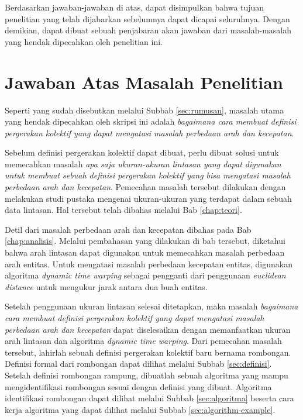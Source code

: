 Berdasarkan jawaban-jawaban di atas, dapat disimpulkan bahwa tujuan penelitian yang telah dijabarkan sebelumnya dapat dicapai seluruhnya. Dengan demikian, dapat dibuat sebuah penjabaran akan jawaban dari masalah-masalah yang hendak dipecahkan oleh penelitian ini.

\section{Jawaban Atas Masalah Penelitian}
\label{sec:jawaban-masalah}

Seperti yang sudah disebutkan melalui Subbab \ref{sec:rumusan}, masalah utama yang hendak dipecahkan oleh skripsi ini adalah \textit{bagaimana cara membuat definisi pergerakan kolektif yang dapat mengatasi masalah perbedaan arah dan kecepatan}.

Sebelum definisi pergerakan kolektif dapat dibuat, perlu dibuat solusi untuk memecahkan masalah \textit{apa saja ukuran-ukuran lintasan yang dapat digunakan untuk membuat sebuah definisi pergerakan kolektif yang bisa mengatasi masalah perbedaan arah dan kecepatan}. Pemecahan masalah tersebut dilakukan dengan melakukan studi pustaka mengenai ukuran-ukuran yang terdapat dalam sebuah data lintasan. Hal tersebut telah dibahas melalui Bab \ref{chap:teori}.

Detil dari masalah perbedaan arah dan kecepatan dibahas pada Bab \ref{chap:analisis}. Melalui pembahasan yang dilakukan di bab tersebut, diketahui bahwa arah lintasan dapat digunakan untuk memecahkan masalah perbedaan arah entitas. Untuk mengatasi masalah perbedaan kecepatan entitas, digunakan algoritma \textit{dynamic time warping} sebagai pengganti dari penggunaan \textit{euclidean distance} untuk mengukur jarak antara dua buah entitas.

Setelah penggunaan ukuran lintasan selesai ditetapkan, maka masalah \textit{bagaimana cara membuat definisi pergerakan kolektif yang dapat mengatasi masalah perbedaan arah dan kecepatan} dapat diselesaikan dengan memanfaatkan ukuran arah lintasan dan algoritma \textit{dynamic time warping}. Dari pemecahan masalah tersebut, lahirlah sebuah definisi pergerakan kolektif baru bernama rombongan. Definisi formal dari rombongan dapat dilihat melalui Subbab \ref{sec:definisi}. Setelah definisi rombongan rampung, dibuatlah sebuah algoritma yang mampu mengidentifikasi rombongan sesuai dengan definisi yang dibuat. Algoritma identifikasi rombongan dapat dilihat melalui Subbab \ref{sec:algoritma} beserta cara kerja algoritma yang dapat dilihat melalui Subbab \ref{sec:algorithm-example}.

